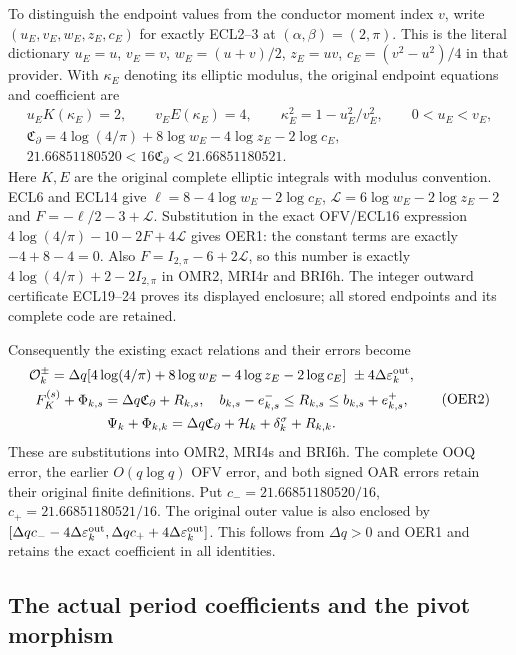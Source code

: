 \documentclass[11pt,a4paper]{article}
\begin{document}
To distinguish the endpoint values from the conductor moment index
$v$, write $(u_E,v_E,w_E,z_E,c_E)$ for exactly ECL2--3 at
$(\alpha,\beta)=(2,\pi)$. This is the literal dictionary
$u_E=u$, $v_E=v$, $w_E=(u+v)/2$, $z_E=uv$,
$c_E=(v^2-u^2)/4$ in that provider. With $\kappa_E$ denoting its
elliptic modulus, the original endpoint equations and coefficient are
\[
\begin{gathered}
 u_EK(\kappa_E)=2,\qquad v_EE(\kappa_E)=4,\qquad
 \kappa_E^2=1-u_E^2/v_E^2,\qquad 0<u_E<v_E,\\
 \mathfrak C_\partial
 =4\log(4/\pi)+8\log w_E-4\log z_E-2\log c_E,\\
 21.66851180520<16\mathfrak C_\partial<21.66851180521 .
\end{gathered}\tag{OER1}
\]
Here $K,E$ are the original complete elliptic integrals with modulus
convention. ECL6 and ECL14 give
$\ell=8-4\log w_E-2\log c_E$,
$\mathcal L=6\log w_E-2\log z_E-2$ and
$F=-\ell/2-3+\mathcal L$. Substitution in the exact OFV/ECL16
expression $4\log(4/\pi)-10-2F+4\mathcal L$ gives OER1:
the constant terms are exactly $-4+8-4=0$.
Also $F=I_{2,\pi}-6+2\mathcal L$, so this number is exactly
$4\log(4/\pi)+2-2I_{2,\pi}$ in OMR2, MRI4r and BRI6h.
The integer outward certificate ECL19--24 proves its displayed
enclosure; all stored endpoints and its complete code are retained.

Consequently the existing exact relations and their errors become
\[
\begin{gathered}
 \mathcal O_k^\pm=\Delta q
  [4\log(4/\pi)+8\log w_E-4\log z_E-2\log c_E]
                         \ \pm4\Delta\varepsilon_k^{\rm out},\\
 F_K^{(s)}+\Phi_{k,s}=\Delta q\mathfrak C_\partial+R_{k,s},
 \quad b_{k,s}-e_{k,s}^-\le R_{k,s}\le b_{k,s}+e_{k,s}^+,\\
 \Psi_k+\Phi_{k,k}
  =\Delta q\mathfrak C_\partial+\mathcal H_k+\delta_k^\sigma+R_{k,k}.
\end{gathered}\tag{OER2}
\]
These are substitutions into OMR2, MRI4s and BRI6h. The complete
OOQ error, the earlier $O(q\log q)$ OFV error, and both signed OAR
errors retain their original finite definitions. Put
$c_-=21.66851180520/16$, $c_+=21.66851180521/16$.
The original outer value is also enclosed by
$[\Delta qc_- -4\Delta\varepsilon_k^{\rm out},
  \Delta qc_+ +4\Delta\varepsilon_k^{\rm out}]$.
This follows from $\Delta q>0$ and OER1 and retains the exact
coefficient in all identities.

\subsection{The actual period coefficients and the pivot morphism}
\end{document}
